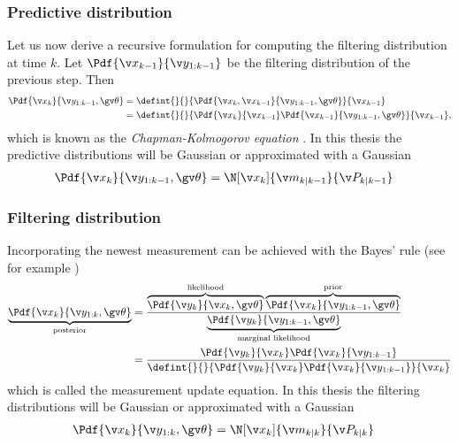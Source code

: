 \subsubsection*{Predictive distribution}
Let us now derive a recursive formulation for computing the filtering distribution at time $k$. Let $\Pdf{\xkk}{\y_{1:k-1}}$
be the filtering distribution of the previous step. Then 
\begin{align}
	\Pdf{\xk}{\y_{1:k-1},\Th}&=\defint{}{}{\Pdf{\xk,\xkk}{\y_{1:k-1},\Th}}{\xkk} \nonumber\\
	&=\defint{}{}{\Pdf{\xk}{\xkk}\Pdf{\xkk}{\y_{1:k-1},\Th}}{\xkk},
	\label{eq:pred_bayes}
\end{align}
which is known as the \emph{Chapman-Kolmogorov equation} \parencite{Sarkka2006}.
In this thesis the predictive distributions will be Gaussian or approximated with a Gaussian
\begin{align}
	\Pdf{\xk}{\y_{1:k-1},\Th}&=\N[\xk]{\m_{k|k-1}}{\P_{k|k-1}}
\end{align}

\subsubsection*{Filtering distribution}
Incorporating the newest measurement can be achieved with the Bayes'
rule (see for example \cite{gelman2004})
\begin{align}
	\underbrace{\Pdf{\xk}{\y_{1:k},\Th}}_\text{posterior}&=\frac{\overbrace{\Pdf{\yk}{\xk,\Th}}^\text{likelihood}\overbrace{\Pdf{\xk}{\y_{1:k-1},\Th}}^\text{prior}}{\underbrace{\Pdf{\y_{k}}{\y_{1:k-1},\Th}}_\text{marginal likelihood}}\nonumber\\
	&=\frac{\Pdf{\yk}{\xk}\Pdf{\xk}{\y_{1:k-1}}}{\defint{}{}{\Pdf{\yk}{\xk}\Pdf{\xk}{\y_{1:k-1}}}{\xk}}
\end{align}
which is called the measurement update equation.
In this thesis the filtering distributions will be Gaussian or approximated with a Gaussian
\begin{align}
	\Pdf{\xk}{\y_{1:k},\Th}&=\N[\xk]{\m_{k|k}}{\P_{k|k}}
\end{align}


